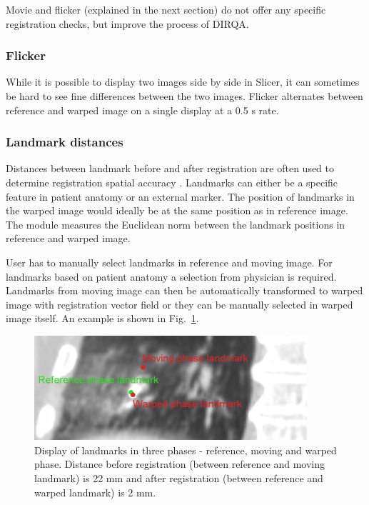 Movie and flicker (explained in the next section) do not offer any specific registration checks, but improve the process of DIRQA.

\subsubsection{Flicker}

While it is possible to display two images side by side in Slicer, it can sometimes be hard to see fine differences between the two images. Flicker alternates between reference and warped image on a single display at a 0.5 s rate.

\subsubsection{Landmark distances}

Distances between landmark before and after registration are often used to determine registration spatial accuracy \cite{Castillo2009}. 
Landmarks can either be a specific feature in patient anatomy or an external marker. The position of landmarks in the warped image would ideally 
be at the same position as in reference image. The module measures the Euclidean norm between the landmark positions in reference and warped image.

User has to manually select landmarks in reference and moving image. For landmarks based on patient anatomy a selection from physician is required. 
Landmarks from moving image can then be automatically transformed to warped image with registration vector field or they can be manually selected in warped image itself. An example is shown in Fig.~\ref{landmark}.

\begin{figure}[H]
\begin{center}
\includegraphics[width=0.9\textwidth]{./VisualMotionManagment/Images/landmark.png}
\caption{Display of landmarks in three phases - reference, moving and warped phase. Distance before registration (between reference and moving landmark) is 22 mm and after registration
(between reference and warped landmark) is 2 mm.}
\label{landmark}
\end{center}
\end{figure}

